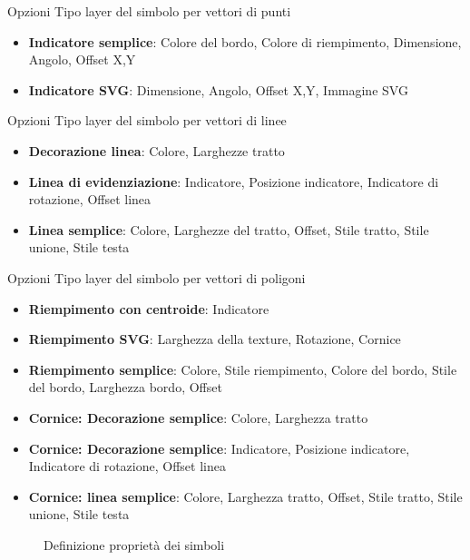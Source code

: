 \begin{description}
\item Opzioni Tipo layer del simbolo per vettori di punti
\begin{itemize}[label=--]
\item \textbf{Indicatore semplice}: Colore del bordo, Colore di riempimento, Dimensione, Angolo, Offset X,Y
\item \textbf{Indicatore SVG}: Dimensione, Angolo, Offset X,Y, Immagine SVG
\end{itemize}
\item Opzioni Tipo layer del simbolo per vettori di linee
\begin{itemize}[label=--]
\item \textbf{Decorazione linea}: Colore, Larghezze tratto
\item \textbf{Linea di evidenziazione}: Indicatore, Posizione indicatore, Indicatore di rotazione, Offset linea
\item \textbf{Linea semplice}: Colore, Larghezze del tratto, Offset, Stile tratto, Stile unione, Stile testa
\end{itemize}
\item Opzioni Tipo layer del simbolo per vettori di poligoni
\begin{itemize}[label=--]
\item \textbf{Riempimento con centroide}: Indicatore
\item \textbf{Riempimento SVG}: Larghezza della texture, Rotazione, Cornice
\item \textbf{Riempimento semplice}: Colore, Stile riempimento, Colore del bordo, Stile del bordo, Larghezza bordo, Offset
\item \textbf{Cornice: Decorazione semplice}: Colore, Larghezza tratto
\item \textbf{Cornice: Decorazione semplice}: Indicatore, Posizione indicatore, Indicatore di rotazione, Offset linea
\item \textbf{Cornice: linea semplice}: Colore, Larghezza tratto, Offset, Stile tratto, Stile unione, Stile testa
\end{itemize}
\end{description}

\begin{figure}[ht]
\centering
   \hspace{1cm}
   \hspace{1cm}
\caption{Definizione proprietà dei simboli \nixcaption}
\end{figure}

